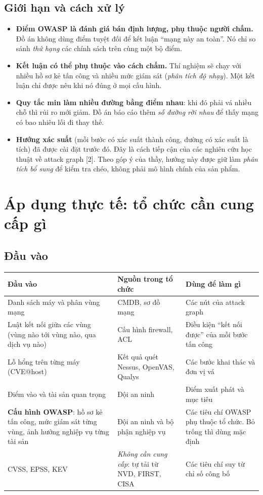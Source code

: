 \documentclass[11pt,a4paper]{article}
\begin{document}
\subsection{Giới hạn và cách xử lý}

\begin{itemize}
  \item \textbf{Điểm OWASP là đánh giá bán định lượng, phụ thuộc người chấm.} Đồ án không dùng điểm tuyệt đối để kết luận ``mạng này an toàn''. Nó chỉ so sánh \emph{thứ hạng} các chính sách trên cùng một bộ điểm.
  \item \textbf{Kết luận có thể phụ thuộc vào cách chấm.} Thí nghiệm sẽ chạy với nhiều hồ sơ kẻ tấn công và nhiều mức giám sát (\emph{phân tích độ nhạy}). Một kết luận chỉ được nêu khi nó đúng ở mọi cấu hình.
  \item \textbf{Quy tắc min làm nhiều đường bằng điểm nhau}: khi đó phải vá nhiều chỗ thì rủi ro mới giảm. Đồ án báo cáo thêm \emph{số đường rời nhau} để thấy mạng có bao nhiêu lối đi thay thế.
  \item \textbf{Hướng xác suất} (mỗi bước có xác suất thành công, đường có xác suất là tích) đã được cài đặt trước đó. Đây là cách tiếp cận của các nghiên cứu học thuật về attack graph [2]. Theo góp ý của thầy, hướng này được giữ làm \emph{phân tích bổ sung} để kiểm tra chéo, không phải mô hình chính của sản phẩm.
\end{itemize}

\section{Áp dụng thực tế: tổ chức cần cung cấp gì}

\subsection{Đầu vào}

\begin{center}
\small
\begin{tabular}{@{}Y{4.4cm}Y{4.6cm}Y{6.0cm}@{}}
\toprule
\textbf{Đầu vào} & \textbf{Nguồn trong tổ chức} & \textbf{Dùng để làm gì} \\
\midrule
Danh sách máy và phân vùng mạng & CMDB, sơ đồ mạng & Các nút của attack graph \\
Luật kết nối giữa các vùng (vùng nào tới vùng nào, qua dịch vụ nào) & Cấu hình firewall, ACL & Điều kiện ``kết nối được'' của mỗi bước tấn công \\
Lỗ hổng trên từng máy (CVE@host) & Kết quả quét Nessus, OpenVAS, Qualys & Các bước khai thác và đơn vị vá \\
Điểm vào và tài sản quan trọng & Đội an ninh & Điểm xuất phát và mục tiêu \\
\textbf{Cấu hình OWASP}: hồ sơ kẻ tấn công, mức giám sát từng vùng, ảnh hưởng nghiệp vụ từng tài sản & Đội an ninh và bộ phận nghiệp vụ & Các tiêu chí OWASP phụ thuộc tổ chức. Bỏ trống thì dùng mặc định \\
\midrule
CVSS, EPSS, KEV & \emph{Không cần cung cấp}: tự tải từ NVD, FIRST, CISA & Các tiêu chí suy từ chỉ số công bố \\
\bottomrule
\end{tabular}
\end{center}
\end{document}
